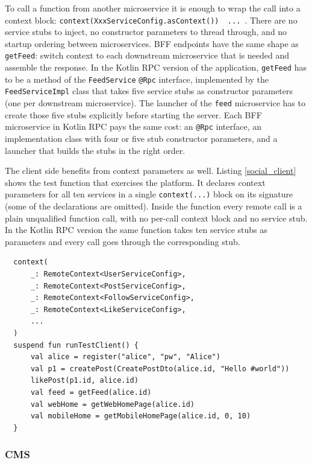 \documentclass[a4paper,11pt,oneside]{article}
\newcommand{\kotlini}[1]{\texttt{#1}}
\begin{document}
To call a function from another microservice it is enough to wrap the call into a context block:
\kotlini{context(XxxServiceConfig.asContext()) { ... }}. There are no service stubs to
inject, no constructor parameters to thread through, and no startup ordering between
microservices. BFF endpoints have the same shape as \kotlini{getFeed}: switch context to each
downstream microservice that is needed and assemble the response. In the Kotlin RPC version of the
application, \kotlini{getFeed} has to be a method of the \kotlini{FeedService} \kotlini{@Rpc}
interface, implemented by the \kotlini{FeedServiceImpl} class that takes five service stubs as
constructor parameters (one per downstream microservice). The launcher of the \kotlini{feed}
microservice has to create those five stubs explicitly before starting the server. Each BFF
microservice in Kotlin RPC pays the same cost: an \kotlini{@Rpc} interface, an implementation class
with four or five stub constructor parameters, and a launcher that builds the stubs in the right
order.

The client side benefits from context parameters as well. Listing \ref{social_client} shows the test
function that exercises the platform. It declares context parameters for all ten services in a
single \kotlini{context(...)} block on its signature (some of the declarations are omitted). Inside
the function every remote call is a plain unqualified function call, with no per-call context block and
no service stub. In the Kotlin RPC version the same function takes ten service stubs as parameters and
every call goes through the corresponding stub.

\begin{listing}[!h]
  \begin{verbatim}
  context(
      _: RemoteContext<UserServiceConfig>, 
      _: RemoteContext<PostServiceConfig>,
      _: RemoteContext<FollowServiceConfig>, 
      _: RemoteContext<LikeServiceConfig>,
      ...
  )
  suspend fun runTestClient() {
      val alice = register("alice", "pw", "Alice")
      val p1 = createPost(CreatePostDto(alice.id, "Hello #world"))
      likePost(p1.id, alice.id)
      val feed = getFeed(alice.id)
      val webHome = getWebHomePage(alice.id)
      val mobileHome = getMobileHomePage(alice.id, 0, 10)
  }
  \end{verbatim}
  \caption{Multi-context client function in social platform}\label{social_client}
\end{listing}

\subsubsection{CMS} \label{cms_app_section}
\end{document}
